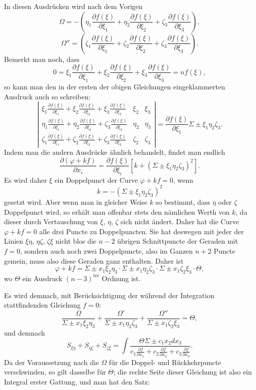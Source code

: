 \documentclass[10pt]{article}
\begin{document}
In diesen Ausdrücken wird nach dem Vorigen
\[
\Omega=-\left(\eta_1\frac{\partial f(\xi)}{\partial \xi_1}+\eta_2\frac{\partial f(\xi)}{\partial \xi_2}+\zeta_3\frac{\partial f(\xi)}{\partial \xi_3}\right),
\]
\[
\Omega''=\left(\zeta_1\frac{\partial f(\xi)}{\partial \xi_1}+\zeta_2\frac{\partial f(\xi)}{\partial \xi_2}+\zeta_3\frac{\partial f(\xi)}{\partial \xi_3}\right).
\]
Bemerkt man noch, dass
\[
0=\xi_1\frac{\partial f(\xi)}{\partial \xi_1}+\xi_2\frac{\partial f(\xi)}{\partial \xi_2}+\xi_3\frac{\partial f(\xi)}{\partial \xi_3}=nf(\xi),
\]
so kann man den in der ersten der obigen Gleichungen eingeklammerten Ausdruck auch so schreiben:
\[
\left|
\begin{array}{ccc}
\xi_1\frac{\partial f(\xi)}{\partial \xi_1}+\xi_2\frac{\partial f(\xi)}{\partial \xi_2}+\xi_3\frac{\partial f(\xi)}{\partial \xi_3} & \xi_2 & \xi_3\\
\eta_1\frac{\partial f(\xi)}{\partial \xi_1}+\eta_2\frac{\partial f(\xi)}{\partial \xi_2}+\zeta_3\frac{\partial f(\xi)}{\partial \xi_3} & \eta_2 & \eta_3\\
\zeta_1\frac{\partial f(\xi)}{\partial \xi_1}+\zeta_2\frac{\partial f(\xi)}{\partial \xi_2}+\zeta_3\frac{\partial f(\xi)}{\partial \xi_3} & \zeta_2 & \zeta_3
\end{array}
\right|
=\frac{\partial f(\xi)}{\partial \xi_1}\Sigma\pm \xi_1\eta_2\zeta_3.
\]
Indem man die andern Ausdrücke ähnlich behandelt, findet man endlich
\[
\frac{\partial(\varphi+kf)}{\partial x_i}=\frac{\partial f(\xi)}{\partial \xi_i}\left[k+(\Sigma\pm\xi_1\eta_2\zeta_3)^2\right].
\]
Es wird daher $\xi$ ein Doppelpunct der Curve $\varphi+kf=0$, wenn
\[
k=-(\Sigma\pm\xi_1\eta_2\zeta_3)^2
\]
gesetzt wird. Aber wenn man in gleicher Weise $k$ so bestimmt, dass $\eta$ oder $\zeta$ Doppelpunct wird, so erhält man offenbar stets den nämlichen Werth von $k$, da dieser durch Vertauschung von $\xi$, $\eta$, $\zeta$ sich nicht ändert. Daher hat die Curve $\varphi+kf=0$ alle drei Puncte zu Doppelpuncten. Sie hat deswegen mit jeder der Linien $\xi\eta$, $\eta\zeta$, $\zeta\xi$ nicht blos die $n-2$ übrigen Schnittpuncte der Geraden mit $f=0$, sondern auch noch zwei Doppelpuncte, also im Ganzen $n+2$ Puncte gemein, muss also diese Geraden ganz enthalten. Daher ist
\[
\varphi+kf=\Sigma\pm x_1\xi_2\eta_3\cdot\Sigma\pm x_1\eta_2\zeta_3\cdot\Sigma\pm x_1\zeta_2\xi_3\cdot\Theta,
\]
wo $\Theta$ ein Ausdruck $(n-3)^{\mathrm{ter}}$ Ordnung ist.

Es wird demnach, mit Berücksichtigung der während der Integration stattfindenden Gleichung $f=0$:
\[
\frac{\Omega}{\Sigma\pm x_1\xi_2\eta_3}
+\frac{\Omega'}{\Sigma\pm x_1\eta_2\zeta_3}
+\frac{\Omega''}{\Sigma\pm x_1\zeta_2\xi_3}=\Theta,
\]
und demnach
\[
S_{\xi\eta}+S_{\eta\zeta}+S_{\zeta\xi}
=\int\frac{\Theta\Sigma\pm c_1x_2dx_3}{c_1\frac{\partial f}{\partial x_1}+c_2\frac{\partial f}{\partial x_2}+c_3\frac{\partial f}{\partial x_3}}.
\]
Da der Voraussetzung nach die $\Omega$ für die Doppel- und Rückkehrpuncte verschwinden, so gilt dasselbe für $\Theta$; die rechte Seite dieser Gleichung ist also ein Integral erster Gattung, und man hat den Satz:
\end{document}
